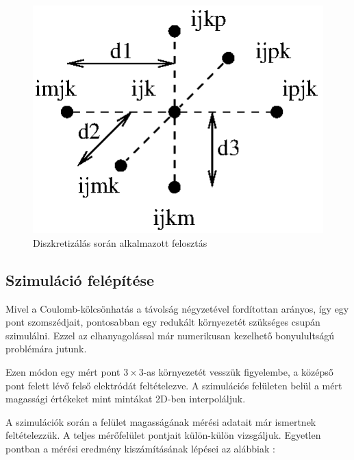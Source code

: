 	\begin{figure}[!ht]
		\centering
		\includegraphics[width=0.95\columnwidth]{kepek/sema.eps}
		\caption{Diszkretizálás során alkalmazott felosztás} 
	\end{figure}

	

	\subsection{Szimuláció felépítése} 
	
	Mivel a Coulomb-kölcsönhatás a távolság négyzetével fordítottan arányos,
	így egy pont szomszédjait, pontosabban egy redukált környezetét szükséges
	csupán szimulálni.
	Ezzel az elhanyagolással már numerikusan kezelhető bonyulultságú problémára
	jutunk.
	
	Ezen módon egy mért pont $3\times3$-as környezetét vesszük figyelembe,
	a középső pont felett lévő felső elektródát feltételezve.
	A szimulációs felületen belül a mért magassági értékeket
	mint mintákat 2D-ben interpoláljuk.

	A szimulációk során a felület magasságának mérési adatait már ismertnek feltételezzük.
	A teljes mérőfelület pontjait külön-külön vizsgáljuk.
	Egyetlen pontban a mérési eredmény kiszámításának lépései az alábbiak :
	
